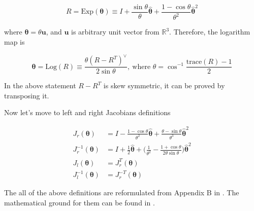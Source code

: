 \begin{equation}
    R = \text{Exp}(\boldsymbol{\theta}) \equiv
    I + \frac{\sin \theta}{\theta} \hat{\boldsymbol{\theta}} +
    \frac{1 - \cos \theta}{\theta^2} \hat{\boldsymbol{\theta}}^2
    \label{eqn:exp_map}
\end{equation}

where $\boldsymbol{\theta} = \theta \mathbf{u}$, and $\mathbf{u}$ is 
arbitrary unit vector from $\mathbb{R}^3$. Therefore, the logarithm map is

\begin{equation}
    \boldsymbol{\theta} = \text{Log}(R) \equiv 
    \frac{\theta (R - R^T)^{\vee}}{2 \sin \theta}, \ 
    \text{where } 
    \theta = \cos^{-1} \frac{\text{trace}(R) - 1}{2}
    \label{eqn:log_map}
\end{equation}

In the above statement $R - R^T$ is skew symmetric, it can be proved by 
transposing it. 

Now let's move to left and right Jacobians definitions 

\begin{equation}
    \begin{aligned}
        J_r(\boldsymbol{\theta}) & = 
        I - \frac{1 - \cos \theta}{\theta^2} \hat{\boldsymbol{\theta}} +
        \frac{\theta - \sin \theta}{\theta^3} \hat{\boldsymbol{\theta}}^2 \\
        J_r^{-1}(\boldsymbol{\theta}) & = 
        I + \frac{1}{2} \hat{\boldsymbol{\theta}} + 
        \biggl( \frac{1}{\theta^2} - 
        \frac{1 + \cos \theta}{2 \theta \sin \theta} \biggr)
        \hat{\boldsymbol{\theta}}^2 \\ 
        J_l(\boldsymbol{\theta}) & = J_r^T(\boldsymbol{\theta}) \\
        J_l^{-1}(\boldsymbol{\theta}) & = J_r^{-T}(\boldsymbol{\theta})
    \end{aligned}
    \label{eqn:l_and_r_jacobians}
\end{equation}

The all of the above definitions are reformulated from Appendix B in 
\cite{MicroLieTheory}. The mathematical ground for them can be found 
in \cite{LieStochModels}.
